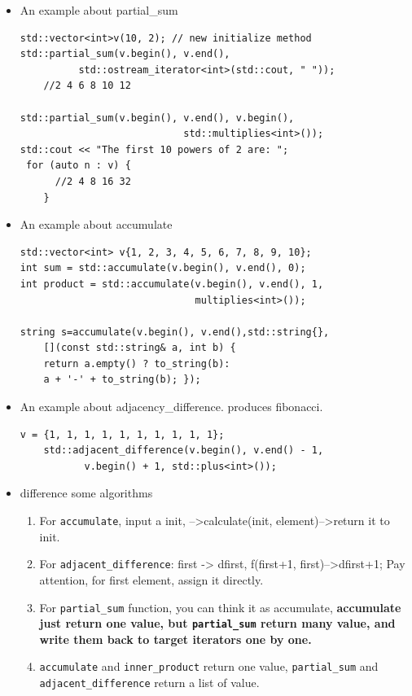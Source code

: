 \documentclass[a4paper,11pt,twoside]{book}
\begin{document}
\begin{itemize}

\item An example about partial\_sum

\begin{lstlisting}[numbers=none]
std::vector<int>v(10, 2); // new initialize method
std::partial_sum(v.begin(), v.end(),
          std::ostream_iterator<int>(std::cout, " "));
    //2 4 6 8 10 12

std::partial_sum(v.begin(), v.end(), v.begin(),
                            std::multiplies<int>());
std::cout << "The first 10 powers of 2 are: ";
 for (auto n : v) {
      //2 4 8 16 32
    }
\end{lstlisting}
\item An example about accumulate

\begin{lstlisting}[numbers=none]
std::vector<int> v{1, 2, 3, 4, 5, 6, 7, 8, 9, 10};
int sum = std::accumulate(v.begin(), v.end(), 0);
int product = std::accumulate(v.begin(), v.end(), 1,
                              multiplies<int>());

string s=accumulate(v.begin(), v.end(),std::string{},
    [](const std::string& a, int b) {
    return a.empty() ? to_string(b): 
    a + '-' + to_string(b); });
\end{lstlisting}

\item An example about adjacency\_difference. produces fibonacci.
\begin{lstlisting}[numbers=none]
 v = {1, 1, 1, 1, 1, 1, 1, 1, 1, 1};
    std::adjacent_difference(v.begin(), v.end() - 1,
           v.begin() + 1, std::plus<int>());

\end{lstlisting}

\item difference some algorithms
\begin{enumerate}
\item For \texttt{accumulate}, input a init, -->calculate(init, element)-->return it to init.
\item For \texttt{adjacent\_difference}:   first -> dfirst,  f(first+1, first)-->dfirst+1; Pay attention, for first element, assign it directly.
\item For \texttt{partial\_sum} function, you can think it as accumulate, \textbf{accumulate just return one value, but \texttt{partial\_sum} return many value, and write them back to target iterators one by one.  }
\item \texttt{accumulate} and \texttt{inner\_product} return one value, \texttt{partial\_sum} and \texttt{adjacent\_difference} return a list of value.
\end{enumerate}

\end{itemize}
\end{document}

